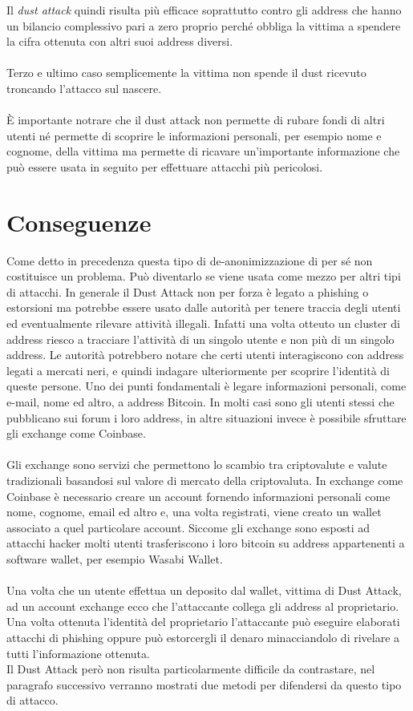 \FloatBarrier
Il \textit{dust attack} quindi risulta più efficace soprattutto contro gli address che hanno un bilancio complessivo pari a zero proprio perché obbliga la vittima a spendere la cifra ottenuta con altri suoi address diversi.\\\\
Terzo e ultimo caso semplicemente la vittima non spende il dust ricevuto troncando l'attacco sul nascere.\\\\
È importante notrare che il dust attack non permette di rubare fondi di altri utenti né permette di scoprire le informazioni personali, per esempio nome e cognome, della vittima ma permette di ricavare un'importante informazione che può essere usata in seguito per effettuare attacchi più pericolosi.
\section{Conseguenze}
Come detto in precedenza questa tipo di de-anonimizzazione di per sé non costituisce un problema. Può diventarlo se viene usata come mezzo per altri tipi di attacchi. In generale il Dust Attack non per forza è legato a phishing o estorsioni ma potrebbe essere usato dalle autorità per tenere traccia degli utenti ed eventualmente rilevare attività illegali. Infatti una volta otteuto un cluster di address riesco a tracciare l'attività di un singolo utente e non più di un singolo address. Le autorità potrebbero notare che certi utenti interagiscono con address legati a mercati neri, e quindi indagare ulteriormente per scoprire l'identità di queste persone. Uno dei punti fondamentali è legare informazioni personali, come e-mail, nome ed altro, a address Bitcoin. In molti casi sono gli utenti stessi che pubblicano sui forum i loro address, in altre situazioni invece è possibile sfruttare gli exchange come Coinbase.\\\\Gli exchange sono servizi che permettono lo scambio tra criptovalute e valute tradizionali basandosi sul valore di mercato della criptovaluta. In exchange come Coinbase è necessario creare un account fornendo informazioni personali come nome, cognome, email ed altro e, una volta registrati, viene creato un wallet associato a quel particolare account. Siccome gli exchange sono esposti ad attacchi hacker molti utenti trasferiscono i loro bitcoin su address appartenenti a software wallet, per esempio Wasabi Wallet.\\\\
Una volta che un utente effettua un deposito dal wallet, vittima di Dust Attack, ad un account exchange ecco che l'attaccante collega gli address al proprietario. Una volta ottenuta l'identità del proprietario l'attaccante può eseguire elaborati attacchi di phishing oppure può estorcergli il denaro minacciandolo di rivelare a tutti l'informazione ottenuta.\\ Il Dust Attack però non risulta particolarmente difficile da contrastare, nel paragrafo successivo verranno mostrati due metodi per difendersi da questo tipo di attacco.

